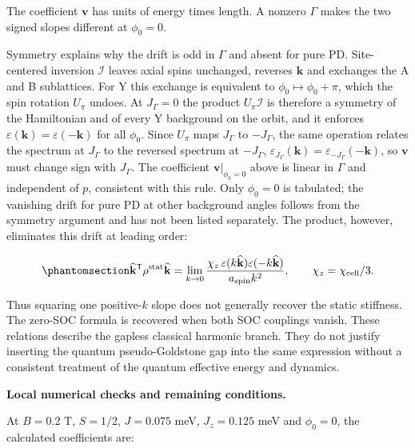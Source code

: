 The coefficient \(\mathbf v\) has units of energy times length. A
nonzero \(\Gamma\) makes the two signed slopes different at
\(\phi_0=0\).

Symmetry explains why the drift is odd in \(\Gamma\) and absent for
pure PD. Site-centered inversion \(\mathcal I\) leaves axial spins
unchanged, reverses \(\mathbf k\) and exchanges the A and B sublattices.
For Y this exchange is equivalent to \(\phi_0\mapsto\phi_0+\pi\), which
the spin rotation \(U_\pi\) undoes. At \(J_\Gamma=0\) the product
\(U_\pi\mathcal I\) is therefore a symmetry of the Hamiltonian and of
every Y background on the orbit, and it enforces
\(\varepsilon(\mathbf k)=\varepsilon(-\mathbf k)\) for all \(\phi_0\).
Since \(U_\pi\) maps \(J_\Gamma\) to \(-J_\Gamma\), the same operation
relates the spectrum at \(J_\Gamma\) to the reversed spectrum at
\(-J_\Gamma\), \(\varepsilon_{J_\Gamma}(\mathbf k)=\varepsilon_{-J_\Gamma}(-\mathbf k)\),
so \(\mathbf v\) must change sign with \(J_\Gamma\). The coefficient
\(\mathbf v|_{\phi_0=0}\) above is linear in \(\Gamma\) and independent
of \(p\), consistent with this rule. Only \(\phi_0=0\) is tabulated; the
vanishing drift for pure PD at other background angles follows from the
symmetry argument and has not been listed separately. The product, however, eliminates this drift at leading
order:

\begin{equation}\phantomsection\label{eq-nbcp-y-soc-paired-estimator}{
\widehat{\mathbf k}^{\mathsf T}\rho^{\rm stat}\widehat{\mathbf k}
=\lim_{k\to0}
\frac{\chi_z\,\varepsilon(k\widehat{\mathbf k})
\varepsilon(-k\widehat{\mathbf k})}{a_{\rm spin}k^2},
\qquad \chi_z=\chi_{\rm cell}/3.
}\end{equation}

Thus squaring one positive-\(k\) slope does not generally recover the
static stiffness. The zero-SOC formula is recovered when both SOC
couplings vanish. These relations describe the gapless classical
harmonic branch. They do not justify inserting the quantum
pseudo-Goldstone gap into the same expression without a consistent
treatment of the quantum effective energy and dynamics.

\textbf{Local numerical checks and remaining conditions.}

At \(B=0.2\) T, \(S=1/2\), \(J=0.075\) meV, \(J_z=0.125\) meV and
\(\phi_0=0\), the calculated coefficients are:

